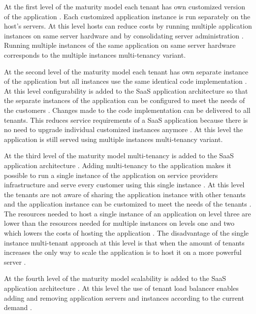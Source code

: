 \documentclass[conference]{sasmoota2017}
\begin{document}
At the first level of the maturity model each tenant has own customized version of the application \cite{Carraro:2006:ArchitectureLongTail}. Each customized application instance is run separately on the host’s servers. At this level hosts can reduce costs by running multiple application instances on same server hardware and by consolidating server administration \cite{Carraro:2006:ArchitectureLongTail}. Running multiple instances of the same application on same server hardware corresponds to the multiple instances multi-tenancy variant. 

At the second level of the maturity model each tenant has own separate instance of the application but all instances use the same identical code implementation \cite{Carraro:2006:ArchitectureLongTail}. At this level configurability is added to the SaaS application architecture so that the separate instances of the application can be configured to meet the needs of the customers \cite{Carraro:2006:ArchitectureLongTail}. Changes made to the code implementation can be delivered to all tenants. This reduces service requirements of a SaaS application because there is no need to upgrade individual customized instances anymore \cite{Carraro:2006:ArchitectureLongTail}. At this level the application is still served using multiple instances multi-tenancy variant.

At the third level of the maturity model multi-tenancy is added to the SaaS application architecture \cite{Carraro:2006:ArchitectureLongTail}. Adding multi-tenancy to the application makes it possible to run a single instance of the application on service providers infrastructure and serve every customer using this single instance \cite{Carraro:2006:ArchitectureLongTail}. At this level the tenants are not aware of sharing the application instance with other tenants and the application instance can be customized to meet the needs of the tenants \cite{Carraro:2006:ArchitectureLongTail}. The resources needed to host a single instance of an application on level three are lower than the resources needed for multiple instances on levels one and two which lowers the costs of hosting the application \cite{Carraro:2006:ArchitectureLongTail}. The disadvantage of the single instance multi-tenant approach at this level is that when the amount of tenants increases the only way to scale the application is to host it on a more powerful server \cite{Carraro:2006:ArchitectureLongTail}. 

At the fourth level of the maturity model scalability is added to the SaaS application architecture \cite{Carraro:2006:ArchitectureLongTail}. At this level the use of tenant load balancer enables adding and removing application servers and instances according to the current demand \cite{Carraro:2006:ArchitectureLongTail}.
\end{document}
